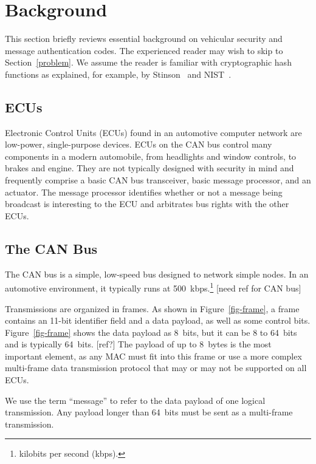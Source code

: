 \section{Background}
\label{background}

This section briefly reviews essential background on vehicular security and message authentication codes. 
The experienced reader may wish to skip to Section~\ref{problem}. 
We assume the reader is familiar with cryptographic hash functions as explained, for example, 
by Stinson~\cite{Stinson} and NIST~\cite{FIPS-180-4}.

\subsection{ECUs}
Electronic Control Units (ECUs) found in an automotive computer network are low-power, single-purpose devices. ECUs on the CAN bus control many components in a modern automobile, from headlights and window controls, to brakes and engine. They are not typically designed with security in mind and frequently comprise a basic CAN bus transceiver, basic message processor, and an actuator. The message processor identifies whether or not a message being broadcast is interesting to the ECU and arbitrates bus rights with the other ECUs. 

\subsection{The CAN Bus}
The CAN bus is a simple, low-speed bus designed to network simple nodes. In an automotive environment, 
it typically runs at 500~kbps.\footnote{kilobits per second (kbps).} 
[need ref for CAN bus]

Transmissions are organized in frames.  As shown in Figure~\ref{fig-frame}, 
a frame contains an 11-bit identifier field and 
a data payload, as well as some control bits. Figure~\ref{fig-frame} shows the data payload as 8~bits, but
it can be 8 to 64~bits and is typically 64~bits. [ref?]
The payload of up to 8~bytes is the most important element, 
as any MAC must fit into this frame or use a more complex multi-frame data transmission protocol 
that may or may not be supported on all ECUs. 

We use the term ``message'' to refer to the data payload of one logical transmission.
Any payload longer than 64~bits must be sent as a multi-frame transmission.



